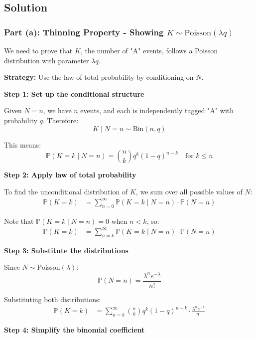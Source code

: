 \documentclass[12pt]{article}
\begin{document}
\subsection{Solution}

\subsubsection{Part (a): Thinning Property - Showing \(K \sim \text{Poisson}(\lambda q)\)}

\begin{solution}
We need to prove that \(K\), the number of "A" events, follows a Poisson distribution with parameter \(\lambda q\).

\textbf{Strategy:} Use the law of total probability by conditioning on \(N\).

\textbf{Step 1: Set up the conditional structure}

Given \(N = n\), we have \(n\) events, and each is independently tagged "A" with probability \(q\). Therefore:
\[
K \mid N = n \sim \text{Bin}(n, q)
\]

This means:
\[
\mathbb{P}(K = k \mid N = n) = \binom{n}{k} q^k (1-q)^{n-k} \quad \text{for } k \leq n
\]

\textbf{Step 2: Apply law of total probability}

To find the unconditional distribution of \(K\), we sum over all possible values of \(N\):
\begin{align*}
\mathbb{P}(K = k) &= \sum_{n=0}^{\infty} \mathbb{P}(K = k \mid N = n) \cdot \mathbb{P}(N = n)
\end{align*}

Note that \(\mathbb{P}(K = k \mid N = n) = 0\) when \(n < k\), so:
\begin{align*}
\mathbb{P}(K = k) &= \sum_{n=k}^{\infty} \mathbb{P}(K = k \mid N = n) \cdot \mathbb{P}(N = n)
\end{align*}

\textbf{Step 3: Substitute the distributions}

Since \(N \sim \text{Poisson}(\lambda)\):
\[
\mathbb{P}(N = n) = \frac{\lambda^n e^{-\lambda}}{n!}
\]

Substituting both distributions:
\begin{align*}
\mathbb{P}(K = k) &= \sum_{n=k}^{\infty} \binom{n}{k} q^k (1-q)^{n-k} \cdot \frac{\lambda^n e^{-\lambda}}{n!}
\end{align*}

\textbf{Step 4: Simplify the binomial coefficient}


\end{solution}
\end{document}

